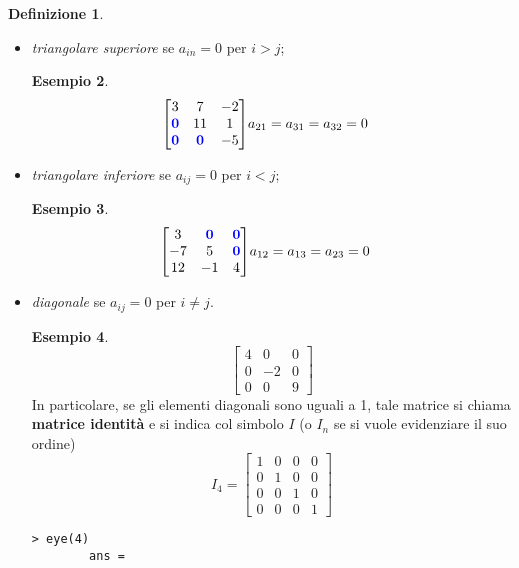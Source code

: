 \documentclass{book}
\theoremstyle{definition}
\newtheorem{defi}{Definizione}[section]
\newtheorem{es}{Esempio}[section]
\theoremstyle{plain}
\begin{document}
\begin{defi}
\begin{itemize}
\begin{es}
\begin{equation*}
      \end{equation*}
    \end{es}
  \item \textit{triangolare superiore} se $a_{in}=0$ per $i>j$;
    \begin{es}
      \label{es:matrice4-3}
      \begin{eqnarray*}
        \begin{bmatrix}
          3 & 7 & -2\\
          \mathbf{\color{blue}0} & 11 & 1\\
          \mathbf{\color{blue}0} & \mathbf{\color{blue}0} & -5
        \end{bmatrix} & a_{21} = a_{31} = a_{32} = 0
      \end{eqnarray*}
    \end{es}
  \item \textit{triangolare inferiore} se $a_{ij}=0$ per $i<j$;
    \begin{es}
      \label{es:matrice4-4}
      \begin{eqnarray*}
        \begin{bmatrix}
          3 & \mathbf{\color{blue}0} & \mathbf{\color{blue}0}\\
          -7 & 5 & \mathbf{\color{blue}0}\\
          12 & -1 & 4
        \end{bmatrix} & a_{12}=a_{13}=a_{23}=0
      \end{eqnarray*}
    \end{es}
  \item \textit{diagonale} se $a_{ij}=0$ per $i\neq j$.
    \begin{es}
      \label{es:matrice4-5}
      \begin{equation*}
        \begin{bmatrix}
          4 & 0 & 0\\
          0 & -2 & 0\\
          0 & 0 & 9
        \end{bmatrix}
      \end{equation*}
      In particolare, se gli elementi diagonali sono uguali a 1, tale
      matrice si chiama \textbf{matrice identità} e si indica col simbolo
      $I$ (o $I_n$ se si vuole evidenziare il suo ordine)
      \begin{equation*}
        I_4=
        \begin{bmatrix}
          1 & 0 & 0 & 0\\
          0 & 1 & 0 & 0\\
          0 & 0 & 1 & 0\\
          0 & 0 & 0 & 1
        \end{bmatrix}
      \end{equation*}
      \begin{lstlisting}[caption=generare una matrice identità in GNU/Octave]
        > eye(4)
        ans =
        

\end{lstlisting}
\end{es}
\end{itemize}
\end{defi}
\end{document}
